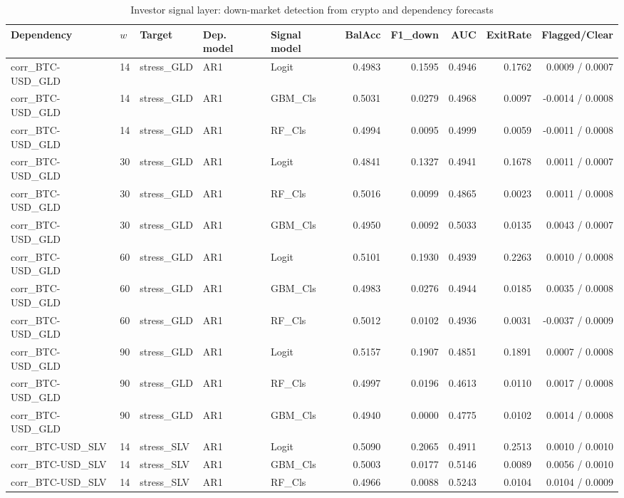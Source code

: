 \begin{table}[H]
\centering
\small
\caption{Investor signal layer: down-market detection from crypto and dependency forecasts}
\label{tab:signal_metrics}
\begin{tabular}{lllllrrrrr}
\toprule
Dependency & $w$ & Target & Dep. model & Signal model & BalAcc & F1_down & AUC & ExitRate & Flagged/Clear \\
\midrule
corr_BTC-USD_GLD & 14 & stress_GLD & AR1 & Logit & 0.4983 & 0.1595 & 0.4946 & 0.1762 & 0.0009 / 0.0007 \\
corr_BTC-USD_GLD & 14 & stress_GLD & AR1 & GBM_Cls & 0.5031 & 0.0279 & 0.4968 & 0.0097 & -0.0014 / 0.0008 \\
corr_BTC-USD_GLD & 14 & stress_GLD & AR1 & RF_Cls & 0.4994 & 0.0095 & 0.4999 & 0.0059 & -0.0011 / 0.0008 \\
corr_BTC-USD_GLD & 30 & stress_GLD & AR1 & Logit & 0.4841 & 0.1327 & 0.4941 & 0.1678 & 0.0011 / 0.0007 \\
corr_BTC-USD_GLD & 30 & stress_GLD & AR1 & RF_Cls & 0.5016 & 0.0099 & 0.4865 & 0.0023 & 0.0011 / 0.0008 \\
corr_BTC-USD_GLD & 30 & stress_GLD & AR1 & GBM_Cls & 0.4950 & 0.0092 & 0.5033 & 0.0135 & 0.0043 / 0.0007 \\
corr_BTC-USD_GLD & 60 & stress_GLD & AR1 & Logit & 0.5101 & 0.1930 & 0.4939 & 0.2263 & 0.0010 / 0.0008 \\
corr_BTC-USD_GLD & 60 & stress_GLD & AR1 & GBM_Cls & 0.4983 & 0.0276 & 0.4944 & 0.0185 & 0.0035 / 0.0008 \\
corr_BTC-USD_GLD & 60 & stress_GLD & AR1 & RF_Cls & 0.5012 & 0.0102 & 0.4936 & 0.0031 & -0.0037 / 0.0009 \\
corr_BTC-USD_GLD & 90 & stress_GLD & AR1 & Logit & 0.5157 & 0.1907 & 0.4851 & 0.1891 & 0.0007 / 0.0008 \\
corr_BTC-USD_GLD & 90 & stress_GLD & AR1 & RF_Cls & 0.4997 & 0.0196 & 0.4613 & 0.0110 & 0.0017 / 0.0008 \\
corr_BTC-USD_GLD & 90 & stress_GLD & AR1 & GBM_Cls & 0.4940 & 0.0000 & 0.4775 & 0.0102 & 0.0014 / 0.0008 \\
corr_BTC-USD_SLV & 14 & stress_SLV & AR1 & Logit & 0.5090 & 0.2065 & 0.4911 & 0.2513 & 0.0010 / 0.0010 \\
corr_BTC-USD_SLV & 14 & stress_SLV & AR1 & GBM_Cls & 0.5003 & 0.0177 & 0.5146 & 0.0089 & 0.0056 / 0.0010 \\
corr_BTC-USD_SLV & 14 & stress_SLV & AR1 & RF_Cls & 0.4966 & 0.0088 & 0.5243 & 0.0104 & 0.0104 / 0.0009 \\

\end{tabular}
\end{table}
